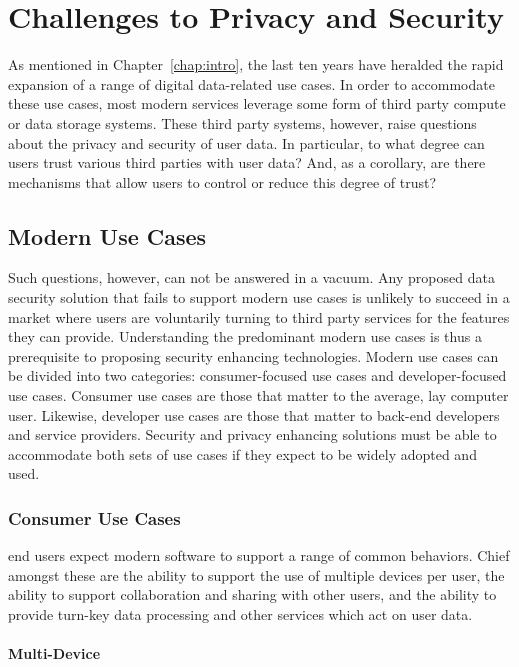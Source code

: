 \chapter{Challenges to Privacy and Security}
\label{chap:challenges}

As mentioned in Chapter~\ref{chap:intro}, the last ten years have
heralded the rapid expansion of a range of digital data-related use
cases. In order to accommodate these use cases, most modern services
leverage some form of third party compute or data storage
systems. These third party systems, however, raise questions about the
privacy and security of user data. In particular, to what degree can
users trust various third parties with user data? And, as a corollary,
are there mechanisms that allow users to control or reduce this degree
of trust?

\section{Modern Use Cases}
\label{chap:challenges:usecases}

Such questions, however, can not be answered in a vacuum. Any proposed
data security solution that fails to support modern use cases is
unlikely to succeed in a market where users are voluntarily turning to
third party services for the features they can provide. Understanding
the predominant modern use cases is thus a prerequisite to proposing
security enhancing technologies. Modern use cases can be divided into
two categories: consumer-focused use cases and developer-focused
use cases. Consumer use cases are those that matter to the average, lay
computer user. Likewise, developer use cases are those that matter to
back-end developers and service providers. Security and privacy
enhancing solutions must be able to accommodate both sets of use cases
if they expect to be widely adopted and used.

\subsection{Consumer Use Cases}

end users expect modern software to support a range of common
behaviors. Chief amongst these are the ability to support the use of
multiple devices per user, the ability to support collaboration and
sharing with other users, and the ability to provide turn-key data
processing and other services which act on user data.

\subsubsection{Multi-Device}

